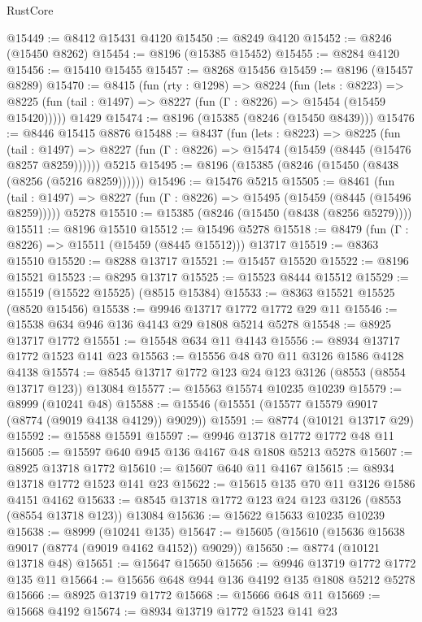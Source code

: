 \begin{lexlean}{RustCore}
\begin{coremodule}
@15449 := @8412 @15431 @4120
@15450 := @8249 @4120
@15452 := @8246 (@15450 @8262)
@15454 := @8196 (@15385 @15452)
@15455 := @8284 @4120
@15456 := @15410 @15455
@15457 := @8268 @15456
@15459 := @8196 (@15457 @8289)
@15470 := @8415
    (fun (rty : @1298) =>
    @8224
      (fun (lets : @8223) =>
      @8225 (fun (tail : @1497) => @8227 (fun (Γ : @8226) => @15454 (@15459 @15420)))))
    @1429
@15474 := @8196 (@15385 (@8246 (@15450 @8439)))
@15476 := @8446 @15415 @8876
@15488 := @8437
    (fun (lets : @8223) =>
    @8225
      (fun (tail : @1497) =>
      @8227 (fun (Γ : @8226) => @15474 (@15459 (@8445 (@15476 @8257 @8259))))))
    @5215
@15495 := @8196 (@15385 (@8246 (@15450 (@8438 (@8256 (@5216 @8259))))))
@15496 := @15476 @5215
@15505 := @8461
    (fun (tail : @1497) => @8227 (fun (Γ : @8226) => @15495 (@15459 (@8445 (@15496 @8259)))))
    @5278
@15510 := @15385 (@8246 (@15450 (@8438 (@8256 @5279))))
@15511 := @8196 @15510
@15512 := @15496 @5278
@15518 := @8479 (fun (Γ : @8226) => @15511 (@15459 (@8445 @15512))) @13717
@15519 := @8363 @15510
@15520 := @8288 @13717
@15521 := @15457 @15520
@15522 := @8196 @15521
@15523 := @8295 @13717
@15525 := @15523 @8444 @15512
@15529 := @15519 (@15522 @15525) (@8515 @15384)
@15533 := @8363 @15521 @15525 (@8520 @15456)
@15538 := @9946 @13717 @1772 @1772 @29 @11
@15546 := @15538 @634 @946 @136 @4143 @29 @1808 @5214 @5278
@15548 := @8925 @13717 @1772
@15551 := @15548 @634 @11 @4143
@15556 := @8934 @13717 @1772 @1523 @141 @23
@15563 := @15556 @48 @70 @11 @3126 @1586 @4128 @4138
@15574 := @8545 @13717 @1772 @123 @24 @123 @3126 (@8553 (@8554 @13717 @123)) @13084
@15577 := @15563 @15574 @10235 @10239
@15579 := @8999 (@10241 @48)
@15588 := @15546 (@15551 (@15577 @15579 @9017 (@8774 (@9019 @4138 @4129)) @9029))
@15591 := @8774 (@10121 @13717 @29)
@15592 := @15588 @15591
@15597 := @9946 @13718 @1772 @1772 @48 @11
@15605 := @15597 @640 @945 @136 @4167 @48 @1808 @5213 @5278
@15607 := @8925 @13718 @1772
@15610 := @15607 @640 @11 @4167
@15615 := @8934 @13718 @1772 @1523 @141 @23
@15622 := @15615 @135 @70 @11 @3126 @1586 @4151 @4162
@15633 := @8545 @13718 @1772 @123 @24 @123 @3126 (@8553 (@8554 @13718 @123)) @13084
@15636 := @15622 @15633 @10235 @10239
@15638 := @8999 (@10241 @135)
@15647 := @15605 (@15610 (@15636 @15638 @9017 (@8774 (@9019 @4162 @4152)) @9029))
@15650 := @8774 (@10121 @13718 @48)
@15651 := @15647 @15650
@15656 := @9946 @13719 @1772 @1772 @135 @11
@15664 := @15656 @648 @944 @136 @4192 @135 @1808 @5212 @5278
@15666 := @8925 @13719 @1772
@15668 := @15666 @648 @11
@15669 := @15668 @4192
@15674 := @8934 @13719 @1772 @1523 @141 @23

\end{coremodule}
\end{lexlean}
